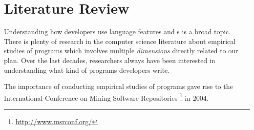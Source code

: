 \chapter{Literature Review}
\label{cha:literature-review}

Understanding how developers use language features
and \api{}s is a broad topic.
There is plenty of research in the computer science literature about
empirical studies of programs which involves multiple \emph{dimensions}
directly related to our plan.
Over the last decades,
researchers always have been interested in understanding what
kind of programs developers write.



The importance of conducting empirical studies of programs gave rise to the International Conference on Mining Software Repositories%
\footnote{\url{http://www.msrconf.org/}}
in 2004.

